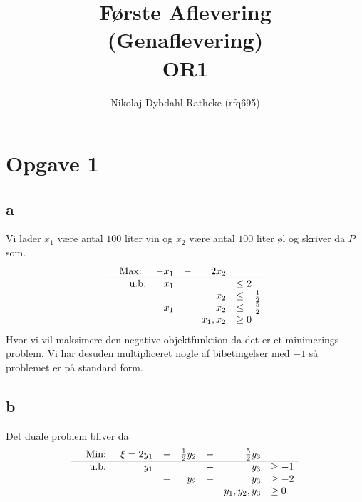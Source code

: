 \documentclass[a4paper]{article}
\author{Nikolaj Dybdahl Rathcke (rfq695)}
\title{Første Aflevering \\ (Genaflevering) \\ OR1}
\begin{document}
\maketitle
\section*{Opgave 1}
\subsection*{a}
Vi lader $x_1$ være antal $100$ liter vin og $x_2$ være antal $100$ liter øl og skriver da $P$ som.
\begin{equation}
\begin{array}{rrrrrl}
&\text{Max: } & -x_1 &- &2x_2 & \\
\hline
&\text{u.b.} &x_1 & & &\leq 2 \\
& & & &-x_2 &\leq -\frac{1}{2} \\
& &-x_1 &- &x_2 &\leq -\frac{5}{2} \\
& & & &x_1,x_2 &\geq 0
\end{array}
\end{equation}
Hvor vi vil maksimere den negative objektfunktion da det er et minimerings problem. Vi har desuden multipliceret nogle af bibetingelser med $-1$ så problemet er på standard form.

\subsection*{b}
Det duale problem bliver da
\begin{equation}
\begin{array}{rrrrrrrl}
&\text{Min: } &\xi=2y_1 &- &\frac{1}{2}y_2 &- &\frac{5}{2}y_3 & \\
\hline
&\text{u.b. } &y_1 & & &- &y_3 &\geq -1 \\
& & &- &y_2 &- &y_3 &\geq -2 \\
& & & & & &y_1,y_2,y_3 &\geq 0
\end{array}
\end{equation}
\newpage
\end{document}
